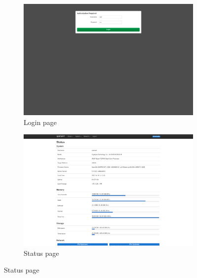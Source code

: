 \begin{figure}[h!]
    \centering

    \begin{subfigure}{0.5\textwidth}
        \centering
        \includegraphics[height=0.6\linewidth]{immagini/LuCI_login}
        \caption{Login page}
        \label{fig:luci-login}
    \end{subfigure}%
    \hfill
    \begin{subfigure}{0.5\textwidth}
        \centering
        \includegraphics[height=0.6\linewidth]{immagini/LuCI_status}
        \caption{Status page}
        \label{fig:luci-status}
    \end{subfigure}%


\end{figure}
